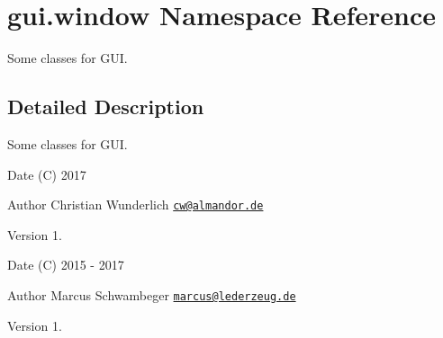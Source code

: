 \hypertarget{namespacegui_1_1window}{}\section{gui.\+window Namespace Reference}
\label{namespacegui_1_1window}


Some classes for G\+UI.  




\subsection{Detailed Description}
Some classes for G\+UI. 

\begin{DoxyDate}{Date}
(C) 2017 
\end{DoxyDate}
\begin{DoxyAuthor}{Author}
Christian Wunderlich  \href{mailto:cw@almandor.de}{\tt cw@almandor.\+de} 
\end{DoxyAuthor}
\begin{DoxyVersion}{Version}
1.
\end{DoxyVersion}
\begin{DoxyDate}{Date}
(C) 2015 -\/ 2017 
\end{DoxyDate}
\begin{DoxyAuthor}{Author}
Marcus Schwambeger  \href{mailto:marcus@lederzeug.de}{\tt marcus@lederzeug.\+de} 
\end{DoxyAuthor}
\begin{DoxyVersion}{Version}
1. 
\end{DoxyVersion}
